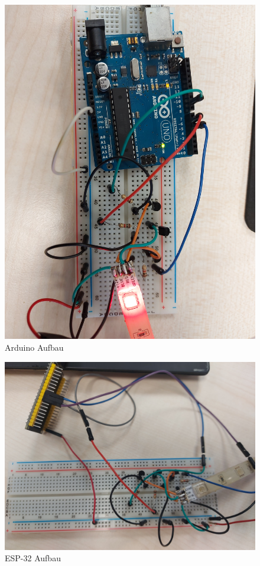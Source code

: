 \begin{figure}[h]
\begin{center}
\includegraphics[width=15cm]{img/arduinoaufbau.jpg}
\caption{Arduino Aufbau}
\label{arduinoaufbau}
\end{center}
\end{figure}

\begin{figure}[h]
\begin{center}
\includegraphics[width=15cm]{img/esp32aufbau.jpg}
\caption{ESP-32 Aufbau}
\label{esp32aufbau}
\end{center}
\end{figure}

